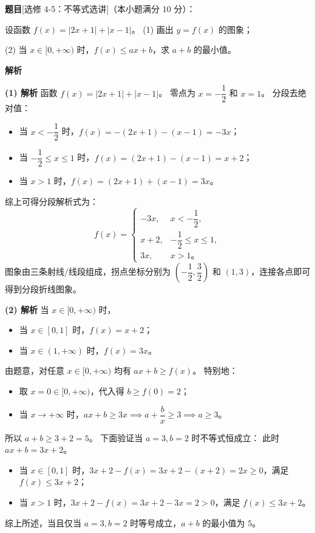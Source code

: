 \begin{answer}

\textbf{题目}[选修 4-5：不等式选讲]（本小题满分 10 分）：

设函数 $f(x) = |2x + 1| + |x - 1|$。
(1) 画出 $y = f(x)$ 的图象；
\nopagebreak[4]
\begin{center}\end{center}
\nopagebreak[4]
(2) 当 $x \in [0, +\infty)$ 时，$f(x) \leqslant ax + b$，求 $a + b$ 的最小值。

\textbf{解析}

\textbf{(1) 解析} 函数 $f(x) = |2x + 1| + |x - 1|$。
零点为 $x = -\dfrac12$ 和 $x = 1$。
分段去绝对值：
\begin{itemize}
\item 当 $x < -\dfrac12$ 时，$f(x) = -(2x + 1) - (x - 1) = -3x$；
\item 当 $-\dfrac12 \leqslant x \leqslant 1$ 时，$f(x) = (2x + 1) - (x - 1) = x + 2$；
\item 当 $x > 1$ 时，$f(x) = (2x + 1) + (x - 1) = 3x$。
\end{itemize}
综上可得分段解析式为：
\nopagebreak[4]
\[f(x) = \begin{cases} -3x, & x < -\dfrac12, \\ x + 2, & -\dfrac12 \leqslant x \leqslant 1, \\ 3x, & x > 1\text{。} \end{cases}\]
图象由三条射线/线段组成，拐点坐标分别为 $\left(-\dfrac12, \dfrac32\right)$ 和 $(1, 3)$，连接各点即可得到分段折线图象。

\textbf{(2) 解析} 当 $x \in [0, +\infty)$ 时，
\begin{itemize}
\item 当 $x \in [0, 1]$ 时，$f(x) = x + 2$；
\item 当 $x \in (1, +\infty)$ 时，$f(x) = 3x$。
\end{itemize}
由题意，对任意 $x \in [0, +\infty)$ 均有 $ax + b \geqslant f(x)$。
特别地：
\begin{itemize}
\item 取 $x = 0 \in [0, +\infty)$，代入得 $b \geqslant f(0) = 2$；
\item 当 $x \to +\infty$ 时，$ax + b \geqslant 3x \implies a + \dfrac{b}{x} \geqslant 3 \implies a \geqslant 3$。
\end{itemize}
所以 $a + b \geqslant 3 + 2 = 5$。
下面验证当 $a = 3, b = 2$ 时不等式恒成立：
此时 $ax + b = 3x + 2$。
\begin{itemize}
\item 当 $x \in [0, 1]$ 时，$3x + 2 - f(x) = 3x + 2 - (x + 2) = 2x \geqslant 0$，满足 $f(x) \leqslant 3x + 2$；
\item 当 $x > 1$ 时，$3x + 2 - f(x) = 3x + 2 - 3x = 2 > 0$，满足 $f(x) \leqslant 3x + 2$。
\end{itemize}
综上所述，当且仅当 $a = 3, b = 2$ 时等号成立，$a + b$ 的最小值为 $5$。


\end{answer}
